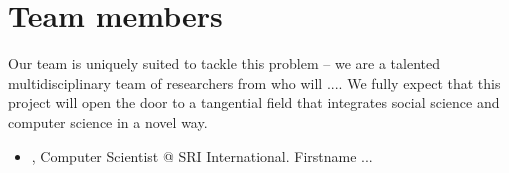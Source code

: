 \section{Team members}
\label{sec:team}
Our team is uniquely suited to tackle this problem -- we are a talented
multidisciplinary team of researchers from \SRI who will .... We fully expect that this project will open the door to a tangential field that integrates social science and computer science in a novel way.

\begin{itemize}
  \addtolength{\itemindent}{3.9mm}
  \item \PI, Computer Scientist @ SRI International. Firstname ...
\end{itemize}
